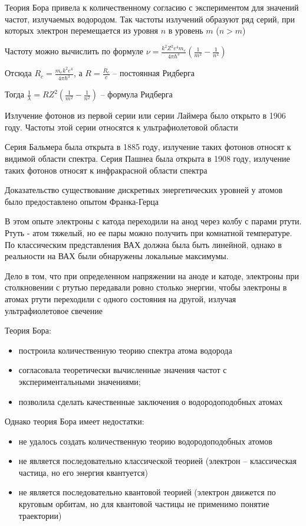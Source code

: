 \documentclass[12pt]{article}
\begin{document}
\mediumvspace

Теория Бора привела к количественному согласию с экспериментом для значений частот, излучаемых водородом. Так частоты излучений образуют ряд серий, при которых электрон перемещается из уровня $n$ в уровень $m$ ($n > m$)

Частоту можно вычислить по формуле $\nu = \frac{k^2 Z^2 e^4 m_e}{4 \pi \hbar^3} \left(\frac{1}{m^2} - \frac{1}{n^2}\right)$

Отсюда $R_c = \frac{m_e k^2 e^4}{4 \pi \hbar^3}$, а $R = \frac{R_c}{c}$ -- постоянная Ридберга

Тогда $\frac{1}{\lambda} = R Z^2 \left(\frac{1}{m^2} - \frac{1}{n^2}\right)$ -- формула Ридберга

Излучение фотонов из первой серии или серии Лаймера было открыто в 1906 году. Частоты этой серии относятся к ультрафиолетовой области

Серия Бальмера была открыта в 1885 году, излучение таких фотонов относят к видимой области спектра. Серия Пашнеа была открыта в 1908 году, излучение таких фотонов относят к инфракрасной области спектра

\mediumvspace

Доказательство существование дискретных энергетических уровней у атомов было предоставлено опытом Франка-Герца

В этом опыте электроны с катода переходили на анод через колбу с парами ртути. Ртуть - атом тяжелый, но ее пары можно получить при комнатной температуре. По классическим представления ВАХ должна была быть линейной, однако в реальности на ВАХ были обнаружены локальные максимумы. 

Дело в том, что при определенном напряжении на аноде и катоде, электроны при столкновении с ртутью передавали ровно столько энергии, чтобы электроны в атомах ртути переходили с одного состояния на другой, излучая ультрафиолетовое свечение

\mediumvspace

Теория Бора:

\begin{itemize}
    \item построила количественную теорию спектра атома водорода
    \item согласовала теоретически вычисленные значения частот с экспериментальными значениями;
    \item позволила сделать качественные заключения о водородоподобных атомах
\end{itemize}

Однако теория Бора имеет недостатки:

\begin{itemize}
    \item не удалось создать количественную теорию водородоподобных атомов
    \item не является последовательно классической теорией (электрон -- классическая частица, но его энергия квантуется)
    \item не является последовательно квантовой теорией (электрон движется по круговым орбитам, но для квантовой частицы не применимо понятие траектории)
\end{itemize}


\end{document}
